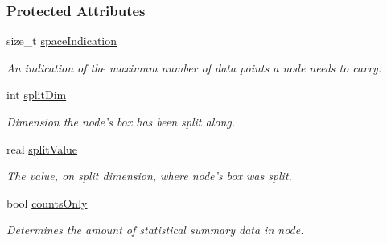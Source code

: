 \subsubsection*{\-Protected \-Attributes}
\begin{DoxyCompactItemize}
\item 
size\-\_\-t \hyperlink{classsubpavings_1_1SPSnode_a4d836fd2b3cd074343475de6f9511c95}{space\-Indication}
\begin{DoxyCompactList}\small\item\em \-An indication of the maximum number of data points a node needs to carry. \end{DoxyCompactList}\item 
int \hyperlink{classsubpavings_1_1SPSnode_afbda0af3b68cf12874faa64aa8a9b154}{split\-Dim}
\begin{DoxyCompactList}\small\item\em \-Dimension the node's box has been split along. \end{DoxyCompactList}\item 
real \hyperlink{classsubpavings_1_1SPSnode_a60ef987525bfd22dd0a5adadc141f0b6}{split\-Value}
\begin{DoxyCompactList}\small\item\em \-The value, on split dimension, where node's box was split. \end{DoxyCompactList}\item 
bool \hyperlink{classsubpavings_1_1SPSnode_a99af67614faaf93216ec0991e96ddb02}{counts\-Only}
\begin{DoxyCompactList}\small\item\em \-Determines the amount of statistical summary data in node. \end{DoxyCompactList}\end{DoxyCompactItemize}
